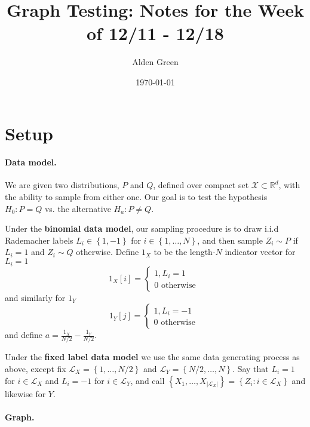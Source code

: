 \documentclass{article}
\newcommand{\Reals}{\mathbb{R}}
\newcommand{\abs}[1]{\left \lvert #1 \right \rvert}
\newcommand{\set}[1]{\left\{#1\right\}}
\newcommand{\Lx}{\mathcal{L}_X}
\newcommand{\X}{\mathcal{X}}
\newcommand{\Rd}{\Reals^d}
\theoremstyle{alden}
\theoremstyle{definition}
\theoremstyle{remark}
\begin{document}
	
\title{Graph Testing: Notes for the Week of 12/11 - 12/18}
\author{Alden Green}
\date{\today}
\maketitle

\section{Setup}

\paragraph{Data model.}

We are given two distributions, $P$ and $Q$, defined over compact set $\X \subset \Rd$, with the ability to sample from either one. Our goal is to test the hypothesis $H_0: P = Q$ vs. the alternative $H_a: P \neq Q$. 

Under the \textbf{binomial data model}, our sampling procedure is to draw i.i.d Rademacher labels $L_i \in \set{1, -1}$ for $i \in \set{1, \ldots, N}$, and then sample 
$Z_i \sim P$ if $L_i = 1$ and $Z_i \sim Q$ otherwise. Define $1_X$ to be the length-$N$ indicator vector for $L_i = 1$
\begin{equation*}
1_X[i] = 
\begin{cases}
1, L_i = 1\\
0 \text{ otherwise } 
\end{cases}
\end{equation*}
and similarly for $1_Y$
\begin{equation*}
1_Y[j] = 
\begin{cases}
1, L_i= -1 \\
0 \text{ otherwise } 
\end{cases}
\end{equation*}
and define $a = \frac{1_X}{N / 2} - \frac{1_Y}{N / 2}$. 

Under the \textbf{fixed label data model} we use the same data generating process as above, except fix $\mathcal{L}_X = \set{1, \ldots, N/2}$ and $\mathcal{L}_Y = \set{N/2, \ldots, N}$. Say that $L_i = 1$ for $i \in \mathcal{L}_X$ and $L_i = -1$ for $i \in \mathcal{L}_Y$, and call $\set{ X_1, \ldots, X_{\abs{\Lx}} } = \set{Z_i: i \in \mathcal{L}_X}$ and likewise for $Y$.

\paragraph{Graph.}
\end{document}
